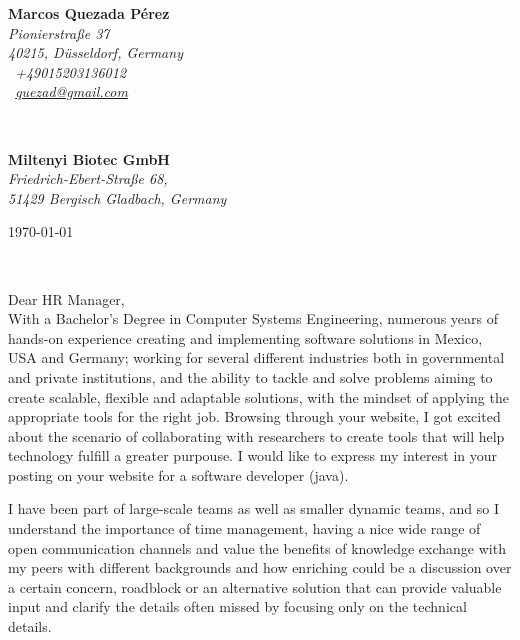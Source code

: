 \documentclass[a4paper,nonstopmode,9.5pt]{article}
\renewcommand{\sffamily}{\rmfamily}
\begin{document}
\sffamily   %
\hfill%
\begin{minipage}[t]{.6\textwidth}
\raggedleft%
{\bfseries Marcos Quezada Pérez}\\[.35ex]
\small\itshape%
Pionierstraße 37\\
40215, Düsseldorf, Germany\\[.35ex]
\Telefon~+49015203136012\\
\Letter~\href{mailto:quezad@gmail.com}{quezad@gmail.com}
\end{minipage}\\[1em]
%
\begin{minipage}[t]{.4\textwidth}
\raggedright%
{\bfseries Miltenyi Biotec GmbH}\\[.35ex]
\small\itshape%
Friedrich-Ebert-Straße 68,\\
51429 Bergisch Gladbach, Germany
\end{minipage}
\hfill %
\begin{minipage}[t]{.4\textwidth}
\raggedleft %
\today
\end{minipage}\\[2em]
\raggedright
Dear HR Manager,\\[1.5em]
%
With a Bachelor’s Degree in Computer Systems Engineering, numerous years of hands-on experience creating and implementing software solutions in Mexico, USA and Germany; working for several different industries both in governmental and private institutions,
and the ability to tackle and solve problems aiming to create scalable, flexible and adaptable solutions, with the mindset of applying the appropriate tools for the right job. Browsing through your website, I got excited about the scenario of collaborating 
with researchers to create tools that will help technology fulfill a greater purpouse. I would like to express my interest in your posting on your website for a software developer (java).

I have been part of large-scale teams as well as smaller dynamic teams, and so I understand the importance of time management, having a nice wide range of open communication channels and value the benefits of knowledge exchange with my peers with different backgrounds 
and how enriching could be a discussion over a certain concern, roadblock or an alternative solution that can provide valuable input and clarify the details often missed by focusing only on the technical details. 
\end{document}
